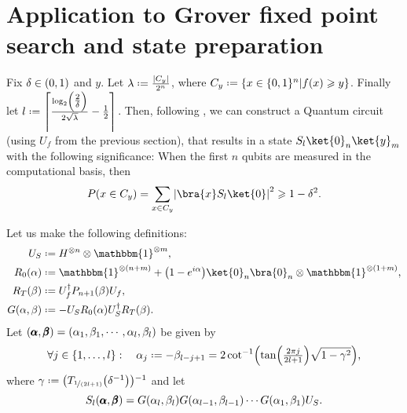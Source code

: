 \documentclass[reqno,oneside,12pt]{amsart}  %
\numberwithin{equation}{section}                %
\let\originalleft\left
\let\originalright\right
\renewcommand{\left}{\mathopen{}\mathclose\bgroup\originalleft}
\renewcommand{\right}{\aftergroup\egroup\originalright}
\def\({\mathopen{}\left(}
\def\){\right)\mathclose{}}
\newcommand*{\eqdef}{\mathrel{\vcenter{\baselineskip0.5ex \lineskiplimit0pt\hbox{.}\hbox{.}}}=}
\def\id{\mathbbm{1}}
\begin{document}
\medskip

\section{Application to Grover fixed point search and state preparation}

Fix $\delta \in \( 0, 1 \)$ and $y$. Let $\lambda \eqdef \tfrac{\left| C_y \right|}{2^n}$, where $C_y \eqdef \left\{ x \in \{ 0, 1 \}^n \middle| f (x) \geqslant y \right\}$. Finally let $l \eqdef \left\lceil \tfrac{\log_2 \( \tfrac{2}{\delta} \)}{2 \sqrt{\lambda}} - \tfrac{1}{2} \right\rceil$. Then, following \cite{yoder_fixed-point_2014}, we can construct a Quantum circuit (using $U_f$ from the previous section), that results in a state $S_l \ket{0}_n \ket{y}_m$ with the following significance: When the first $n$ qubits are measured in the computational basis, then
\begin{equation}
   P \( x \in C_y \) = \sum_{x \in C_y} \left| \bra{x} S_l \ket{0} \right|^2 \geqslant 1 - \delta^2.
\end{equation}

Let us make the following definitions:
\begin{align}
   U_S                     &\eqdef H^{\otimes n} \otimes \id^{\otimes m}, \\
   R_0 \( \alpha \)        &\eqdef \id^{\otimes (n + m)} + \( 1 - e^{i \alpha} \) \ket{0}_n \bra{0}_n \otimes \id^{\otimes (1 + m)}, \\
   R_T \( \beta \)         &\eqdef U_f^\dagger P_{n + 1} \( \beta \) U_f, \\
   G \( \alpha, \beta \)   &\eqdef - U_S R_0 \( \alpha \) U_S^\dagger R_T \( \beta \).
\end{align}
Let $\( \pmb{\alpha}, \pmb{\beta} \) = \( \alpha_1, \beta_1, \cdots, \alpha_l, \beta_l \)$ be given by
\begin{equation}
   \forall j \in \{ 1, \ldots, l \}: \quad \alpha_j \eqdef - \beta_{l - j + 1} = 2 \cot^{- 1} \( \tan \( \tfrac{2 \pi j}{2 l + 1} \) \sqrt{1 - \gamma^2} \),
\end{equation}
where $\gamma \eqdef \( T_{\nicefrac{1}{\( 2 l + 1\)}} \( \delta^{- 1} \) \)^{- 1}$
and let
\begin{equation}
   S_l \( \pmb{\alpha}, \pmb{\beta} \) = G \( \alpha_l, \beta_l \) G \( \alpha_{l - 1}, \beta_{l - 1} \) \cdots G \( \alpha_1, \beta_1 \) U_S. \label{eq:S_l-def}
\end{equation}





   
\end{document}
